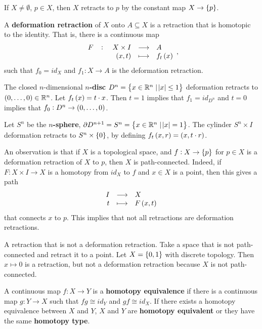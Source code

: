 \begin{example*}
If $ X \ne \emptyset $, $ p \in X $, then $ X $ retracts to $ p $ by the constant map $ X \to \cbr{p} $.
\end{example*}

\begin{definition*}
A \textbf{deformation retraction} of $ X $ onto $ A \subseteq X $ is a retraction that is homotopic to the identity. That is, there is a continuous map
$$ \function[F]{X \times I}{A}{\br{x, t}}{f_t\br{x}}, $$
such that $ f_0 = id_X $ and $ f_1 : X \to A $ is the deformation retraction.
\end{definition*}

\begin{example*}
The closed $ n $-dimensional \textbf{$ n $-disc} $ D^n = \cbr{x \in \R^n \mid \abs{x} \le 1} $ deformation retracts to $ \br{0, \dots, 0} \in \R^n $. Let $ f_t\br{x} = t \cdot x $. Then $ t = 1 $ implies that $ f_1 = id_{D^n} $ and $ t = 0 $ implies that $ f_0 : D^n \to \br{0, \dots, 0} $.
\end{example*}

\begin{example*}
Let $ S^n $ be the \textbf{$ n $-sphere}, $ \partial D^{n + 1} = S^n = \cbr{x \in \R^n \mid \abs{x} = 1} $. The cylinder $ S^n \times I $ deformation retracts to $ S^n \times \cbr{0} $, by defining $ f_t\br{x, r} = \br{x, t \cdot r} $.
\end{example*}

An observation is that if $ X $ is a topological space, and $ f : X \to \cbr{p} $ for $ p \in X $ is a deformation retraction of $ X $ to $ p $, then $ X $ is path-connected. Indeed, if $ F : X \times I \to X $ is a homotopy from $ id_X $ to $ f $ and $ x \in X $ is a point, then this gives a path
$$ \function{I}{X}{t}{F\br{x, t}} $$
that connects $ x $ to $ p $. This implies that not all retractions are deformation retractions.

\begin{example*}
A retraction that is not a deformation retraction. Take a space that is not path-connected and retract it to a point. Let $ X = \cbr{0, 1} $ with discrete topology. Then $ x \mapsto 0 $ is a retraction, but not a deformation retraction because $ X $ is not path-connected.
\end{example*}

\begin{definition*}
A continuous map $ f : X \to Y $ is a \textbf{homotopy equivalence} if there is a continuous map $ g : Y \to X $ such that $ fg \cong id_Y $ and $ gf \cong id_X $. If there exists a homotopy equivalence between $ X $ and $ Y $, $ X $ and $ Y $ are \textbf{homotopy equivalent} or they have the same \textbf{homotopy type}.
\end{definition*}

